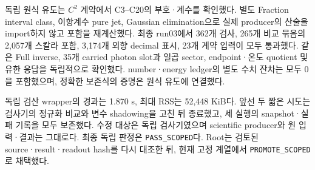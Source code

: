 독립 원식 유도는 $C^2$ 계약에서 C3--C20의 부호·계수를 확인했다.
별도 Fraction interval class, 이항계수 pure jet, Gaussian elimination으로
실제 producer의 산술을 import하지 않고 포함을 재계산했다.
최종 run03에서 362개 검사,
265개 비교 묶음의 2,057개 스칼라 포함,
3,174개 외향 decimal 표시,
23개 계약 입력이 모두 통과했다.
같은 Full inverse, 35개 carried photon slot과 일곱 sector,
endpoint·온도 quotient 및 유한 응답을 독립적으로 확인했다.
number·energy ledger의 별도 수치 잔차는 모두 0을 포함했으며,
정확한 보존식의 증명은 원식 유도에 연결했다.

독립 검산 wrapper의 경과는 1.870 s, 최대 RSS는 52,448 KiB다.
앞선 두 짧은 시도는 검사기의 정규화 비교와 변수 shadowing을 고친 뒤 종료했고,
세 실행의 snapshot·실패 기록을 모두 보존했다.
수정 대상은 독립 검사기였으며 scientific producer와 원 입력·결과는 그대로다.
최종 독립 판정은 \texttt{PASS\_SCOPED}다.
Root는 검토된 source·result·readout hash를 다시 대조한 뒤,
현재 고정 계열에서 \texttt{PROMOTE\_SCOPED}로 채택했다.

